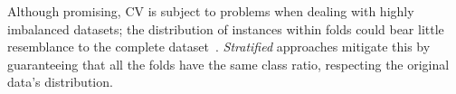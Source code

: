 Although promising, CV is subject to problems when dealing with highly imbalanced datasets;
the distribution of instances within folds could bear little resemblance to the complete dataset~\cite{Kubat2017}. \textit{Stratified} approaches mitigate this by guaranteeing that all the folds have the same class ratio, respecting the original data's distribution.